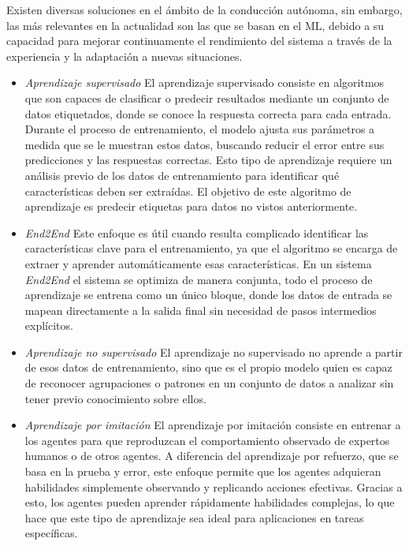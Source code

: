 Existen diversas soluciones en el ámbito de la conducción autónoma, sin embargo, las más relevantes en la actualidad son las que se basan en el \ac{ML}, debido a su capacidad para mejorar continuamente el rendimiento del sistema a través de la experiencia y la adaptación a nuevas situaciones. 

\begin{itemize}
    \item \textit{Aprendizaje supervisado}  \cite{supervised-learning} El aprendizaje supervisado consiste en algoritmos que son capaces de clasificar o predecir resultados mediante un conjunto de datos etiquetados, donde se conoce la respuesta correcta para cada entrada. Durante el proceso de entrenamiento, el modelo ajusta sus parámetros a medida que se le muestran estos datos, buscando reducir el error entre sus predicciones y las respuestas correctas. Esto tipo de aprendizaje requiere un análisis previo de los datos de entrenamiento para identificar qué características deben ser extraídas. El objetivo de este algoritmo de aprendizaje es predecir etiquetas para datos no vistos anteriormente.

    \item \textit{End2End}  \cite{end2end-learning} Este enfoque es útil cuando resulta complicado identificar las características clave para el entrenamiento, ya que el algoritmo se encarga de extraer y aprender automáticamente esas características. En un sistema \textit{End2End} el sistema se optimiza de manera conjunta, todo el proceso de aprendizaje se entrena como un único bloque, donde los datos de entrada se mapean directamente a la salida final sin necesidad de pasos intermedios explícitos.
    
    \item \textit{Aprendizaje no supervisado} \cite{no-supervised-learning} El aprendizaje no supervisado no aprende a partir de esos datos de entrenamiento, sino que es el propio modelo quien es capaz de reconocer agrupaciones o patrones en un conjunto de datos a analizar sin tener previo conocimiento sobre ellos.

    \item \textit{Aprendizaje por imitación} \cite{imitation-learning} El aprendizaje por imitación consiste en entrenar a los agentes para que reproduzcan el comportamiento observado de expertos humanos o de otros agentes. A diferencia del aprendizaje por refuerzo, que se basa en la prueba y error, este enfoque permite que los agentes adquieran habilidades simplemente observando y replicando acciones efectivas. Gracias a esto, los agentes pueden aprender rápidamente habilidades complejas, lo que hace que este tipo de aprendizaje sea ideal para aplicaciones en tareas específicas.


\end{itemize}
